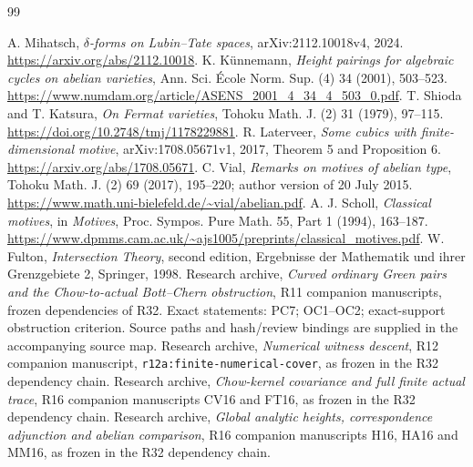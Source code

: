 \documentclass[11pt,a4paper]{article}
\theoremstyle{definition}
\theoremstyle{remark}\newtheorem{remark}[theorem]{Remark}
\numberwithin{equation}{section}
\begin{document}
\begin{thebibliography}{99}

 A. Mihatsch, \emph{$\delta$-forms on Lubin--Tate spaces},
arXiv:2112.10018v4, 2024. \url{https://arxiv.org/abs/2112.10018}.
 K. K\"unnemann, \emph{Height pairings for algebraic cycles on
abelian varieties}, Ann. Sci. \'Ecole Norm. Sup. (4) 34 (2001), 503--523.
\url{https://www.numdam.org/article/ASENS_2001_4_34_4_503_0.pdf}.
 T. Shioda and T. Katsura, \emph{On Fermat varieties},
Tohoku Math. J. (2) 31 (1979), 97--115.
\url{https://doi.org/10.2748/tmj/1178229881}.
 R. Laterveer, \emph{Some cubics with finite-dimensional
motive}, arXiv:1708.05671v1, 2017, Theorem 5 and Proposition 6.
\url{https://arxiv.org/abs/1708.05671}.
 C. Vial, \emph{Remarks on motives of abelian type},
Tohoku Math. J. (2) 69 (2017), 195--220; author version of 20 July 2015.
\url{https://www.math.uni-bielefeld.de/~vial/abelian.pdf}.
 A. J. Scholl, \emph{Classical motives}, in
\emph{Motives}, Proc. Sympos. Pure Math. 55, Part 1 (1994), 163--187.
\url{https://www.dpmms.cam.ac.uk/~ajs1005/preprints/classical_motives.pdf}.
 W. Fulton, \emph{Intersection Theory}, second edition,
Ergebnisse der Mathematik und ihrer Grenzgebiete 2, Springer, 1998.
 Research archive, \emph{Curved ordinary Green
pairs and the Chow-to-actual Bott--Chern obstruction}, R11 companion
manuscripts, frozen dependencies of R32. Exact statements: PC7;
OC1--OC2; exact-support obstruction criterion. Source paths and
hash/review bindings are supplied in the accompanying source map.
 Research archive,
\emph{Numerical witness descent}, R12 companion manuscript,
\texttt{r12a:finite-numerical-cover}, as frozen in the R32 dependency chain.
 Research archive,
\emph{Chow-kernel covariance and full finite actual trace}, R16 companion
manuscripts CV16 and FT16, as frozen in the R32 dependency chain.
 Research archive,
\emph{Global analytic heights, correspondence adjunction and abelian
comparison}, R16 companion manuscripts H16, HA16 and MM16,
as frozen in the R32 dependency chain.
\end{thebibliography}
\end{document}
